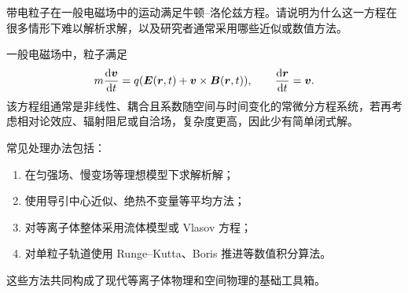\begin{problem}
带电粒子在一般电磁场中的运动满足牛顿--洛伦兹方程。请说明为什么这一方程在很多情形下难以解析求解，以及研究者通常采用哪些近似或数值方法。

\begin{solution}
一般电磁场中，粒子满足
\[
m\dv{\vb*{v}}{t}=q\qty(\vb*{E}(\vb*{r},t)+\vb*{v}\times \vb*{B}(\vb*{r},t)),
\qquad
\dv{\vb*{r}}{t}=\vb*{v}.
\]
该方程组通常是非线性、耦合且系数随空间与时间变化的常微分方程系统，若再考虑相对论效应、辐射阻尼或自洽场，复杂度更高，因此少有简单闭式解。

常见处理办法包括：
\begin{enumerate}
  \item 在匀强场、慢变场等理想模型下求解析解；
  \item 使用导引中心近似、绝热不变量等平均方法；
  \item 对等离子体整体采用流体模型或 Vlasov 方程；
  \item 对单粒子轨道使用 Runge--Kutta、Boris 推进等数值积分算法。
\end{enumerate}
这些方法共同构成了现代等离子体物理和空间物理的基础工具箱。
\end{solution}
\end{problem}
